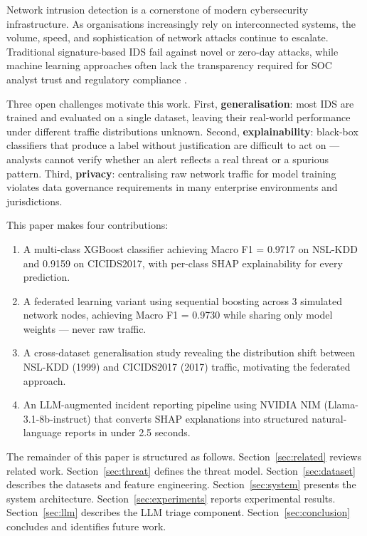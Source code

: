 \documentclass[review]{elsarticle}  %
\begin{document}
Network intrusion detection is a cornerstone of modern cybersecurity
infrastructure. As organisations increasingly rely on interconnected
systems, the volume, speed, and sophistication of network attacks
continue to escalate. Traditional signature-based IDS fail against
novel or zero-day attacks, while machine learning approaches often
lack the transparency required for SOC analyst trust and regulatory
compliance \cite{ref1}.

Three open challenges motivate this work. First,
\textbf{generalisation}: most IDS are trained and evaluated on a
single dataset, leaving their real-world performance under different
traffic distributions unknown. Second, \textbf{explainability}:
black-box classifiers that produce a label without justification
are difficult to act on — analysts cannot verify whether an alert
reflects a real threat or a spurious pattern. Third,
\textbf{privacy}: centralising raw network traffic for model
training violates data governance requirements in many enterprise
environments and jurisdictions.

This paper makes four contributions:

\begin{enumerate}
    \item A multi-class XGBoost classifier achieving Macro F1 = 0.9717
          on NSL-KDD and 0.9159 on CICIDS2017, with per-class SHAP
          explainability for every prediction.

    \item A federated learning variant using sequential boosting across
          3 simulated network nodes, achieving Macro F1 = 0.9730 while
          sharing only model weights — never raw traffic.

    \item A cross-dataset generalisation study revealing the distribution
          shift between NSL-KDD (1999) and CICIDS2017 (2017) traffic,
          motivating the federated approach.

    \item An LLM-augmented incident reporting pipeline using NVIDIA NIM
          (Llama-3.1-8b-instruct) that converts SHAP explanations into
          structured natural-language reports in under 2.5 seconds.
\end{enumerate}

The remainder of this paper is structured as follows.
Section~\ref{sec:related} reviews related work.
Section~\ref{sec:threat} defines the threat model.
Section~\ref{sec:dataset} describes the datasets and feature engineering.
Section~\ref{sec:system} presents the system architecture.
Section~\ref{sec:experiments} reports experimental results.
Section~\ref{sec:llm} describes the LLM triage component.
Section~\ref{sec:conclusion} concludes and identifies future work.
\end{document}
